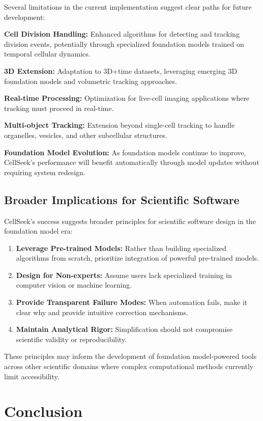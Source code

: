 \documentclass[12pt]{article}
\begin{document}
Several limitations in the current implementation suggest clear paths for future development:

\textbf{Cell Division Handling:} Enhanced algorithms for detecting and tracking division events, potentially through specialized foundation models trained on temporal cellular dynamics.

\textbf{3D Extension:} Adaptation to 3D+time datasets, leveraging emerging 3D foundation models and volumetric tracking approaches.

\textbf{Real-time Processing:} Optimization for live-cell imaging applications where tracking must proceed in real-time.

\textbf{Multi-object Tracking:} Extension beyond single-cell tracking to handle organelles, vesicles, and other subcellular structures.

\textbf{Foundation Model Evolution:} As foundation models continue to improve, CellSeek's performance will benefit automatically through model updates without requiring system redesign.

\subsection{Broader Implications for Scientific Software}

CellSeek's success suggests broader principles for scientific software design in the foundation model era:

\begin{enumerate}
  \item \textbf{Leverage Pre-trained Models:} Rather than building specialized algorithms from scratch, prioritize integration of powerful pre-trained models.
  \item \textbf{Design for Non-experts:} Assume users lack specialized training in computer vision or machine learning.
  \item \textbf{Provide Transparent Failure Modes:} When automation fails, make it clear why and provide intuitive correction mechanisms.
  \item \textbf{Maintain Analytical Rigor:} Simplification should not compromise scientific validity or reproducibility.
\end{enumerate}

These principles may inform the development of foundation model-powered tools across other scientific domains where complex computational methods currently limit accessibility.

\section{Conclusion}
\end{document}
